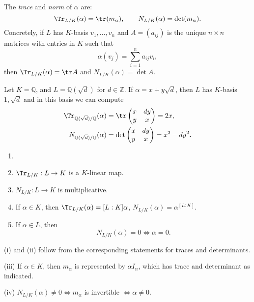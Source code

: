 \documentclass[12pt]{article}
\begin{document}
\begin{definition}
	The \emph{trace} and \emph{norm} of $\alpha$ are:
	\[
	\Tr_{L/K}(\alpha) = \tr(m_\alpha), \qquad N_{L/K}(\alpha) = \det(m_\alpha).
	\]
	Concretely, if $L$ has $K$-basis $v_1, \ldots, v_n$ and $A = (a_{ij})$ is the unique $n \times n$ matrices with entries in $K$ such that
	\[
	\alpha(v_j) = \sum_{i = 1}^{n} a_{ij}v_i,
	\]
	then $\Tr_{L/K}(\alpha) = \tr A$ and $N_{L/K}(\alpha) = \det A$.
\end{definition}

\begin{exbox}
	Let $K = \mathbb{Q}$, and $L = \mathbb{Q}(\sqrt d)$ for $d \in \mathbb{Z}$. If $\alpha = x + y \sqrt d$, then $L$ has $K$-basis $1, \sqrt d$ and in this basis we can compute
	\begin{align*}
		\Tr_{\mathbb{Q}(\sqrt d)/\mathbb{Q}}(\alpha) &= \tr
		\begin{pmatrix}
			x & dy \\
			y & x
		\end{pmatrix}
		 = 2x, \\
		N_{\mathbb{Q}(\sqrt d)/\mathbb{Q}}(\alpha) &= \det
		\begin{pmatrix}
			x & dy \\
			y & x
		\end{pmatrix}
		 = x^2 - dy^2.
	\end{align*}
\end{exbox}

\begin{lemma}
	\begin{enumerate}[\normalfont(i)]
		\item[]
		\item $\Tr_{L/K}: L \to K$ is a $K$-linear map.
		\item $N_{L/K} : L \to K$ is multiplicative.
		\item If $\alpha \in K$, then $\Tr_{L/K}(\alpha) = [L:K]\alpha$, $N_{L/K}(\alpha) = \alpha^{[L:K]}$.
		\item If $\alpha \in L$, then
			\[
			N_{L/K}(\alpha) = 0 \iff \alpha = 0.
			\]
	\end{enumerate}
\end{lemma}

\begin{proofbox}
	(i) and (ii) follow from the corresponding statements for traces and determinants.

	(iii) If $\alpha \in K$, then $m_{\alpha}$ is represented by $\alpha I_n$, which has trace and determinant as indicated.

	(iv) $N_{L/K}(\alpha) \neq 0 \iff m_\alpha$ is invertible $\iff \alpha \neq 0$.
\end{proofbox}
\end{document}
